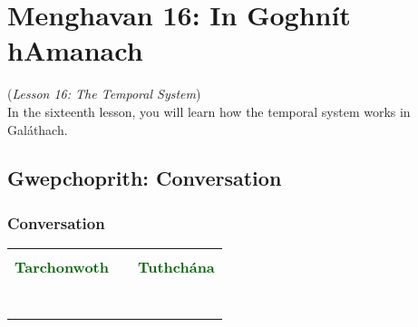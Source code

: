 \section{Menghavan 16: In Goghn\'{i}t hAmanach}
(\textit{Lesson 16: The Temporal System})\\

In the sixteenth lesson, you will learn how the temporal system works in Gal\'{a}thach.

\subsection{Gwepchoprith: Conversation}
\subsubsection{Conversation}

\begin{table}[H]
\centering
    \begin{tabular}{cM{10.0cm}c}
     &  & \\
    \textcolor{darkgreen}{\textbf{Tarchonwoth}} &  & \textcolor{darkgreen}{\textbf{Tuthch\'{a}na}}\\
     &  & \\
     &  & \\
     &  & \\
     &  & \\
     &  & \\
     &  & \\
     &  & 
    \end{tabular}
\end{table}

